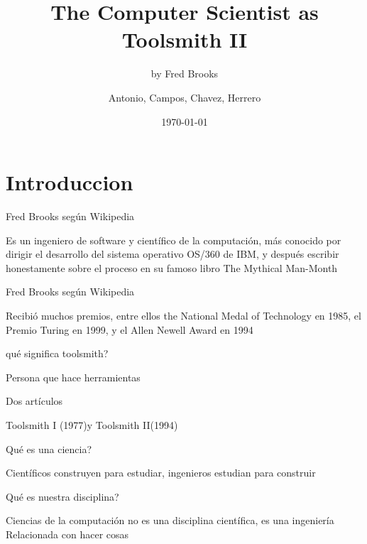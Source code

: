 \documentclass{beamer}
\title{The Computer Scientist as Toolsmith II}
\subtitle{by Fred Brooks}
\author{Antonio, Campos, Chavez, Herrero}
\institute{Ingeniería de Software II}
\date{\today}
\begin{document}
\begin{frame}
\titlepage
\end{frame}

\section{Introduccion}
\begin{frame}{Fred Brooks según Wikipedia}
\begin{center}
Es un ingeniero de software y científico de la computación, 
más conocido por dirigir el desarrollo del sistema operativo OS/360 de IBM, 
y después escribir honestamente sobre el proceso en su famoso libro 
\newline
The Mythical Man-Month
\end{center}
\end{frame}
\begin{frame}{Fred Brooks según Wikipedia}
\begin{center}
Recibió muchos premios, 
entre ellos the National Medal of Technology en 1985,
el Premio Turing en 1999,
y el Allen Newell Award en 1994
\end{center}
\end{frame}

\begin{frame}{qué significa toolsmith?}
\begin{center}
Persona que hace herramientas
\end{center}
\end{frame}

\begin{frame}{Dos artículos}
\begin{center}
Toolsmith I (1977)y Toolsmith II(1994)
\end{center}
\end{frame}

\begin{frame}{Qué es una ciencia?}
\begin{center}
Científicos construyen para estudiar, 
ingenieros estudian para construir
\end{center}
\end{frame}

\begin{frame}{Qué es nuestra disciplina?}
\begin{center}
Ciencias de la computación 
no es una disciplina científica, 
es una ingeniería
\newline
Relacionada con hacer cosas
\end{center}
\end{frame}
\end{document}
